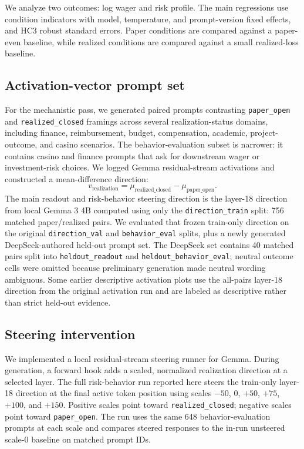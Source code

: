 \documentclass[final]{sparreport}
\begin{document}
We analyze two outcomes: log wager and risk profile. The main regressions use condition indicators with model, temperature, and prompt-version fixed effects, and HC3 robust standard errors. Paper conditions are compared against a paper-even baseline, while realized conditions are compared against a small realized-loss baseline.

\subsection{Activation-vector prompt set}

For the mechanistic pass, we generated paired prompts contrasting \texttt{paper\_open} and \texttt{realized\_closed} framings across several realization-status domains, including finance, reimbursement, budget, compensation, academic, project-outcome, and casino scenarios. The behavior-evaluation subset is narrower: it contains casino and finance prompts that ask for downstream wager or investment-risk choices. We logged Gemma residual-stream activations and constructed a mean-difference direction:
\[
v_{\mathrm{realization}} = \mu_{\mathrm{realized\_closed}} - \mu_{\mathrm{paper\_open}}.
\]
The main readout and risk-behavior steering direction is the layer-18 direction from local Gemma 3 4B computed using only the \texttt{direction\_train} split: 756 matched paper/realized pairs. We evaluated that frozen train-only direction on the original \texttt{direction\_val} and \texttt{behavior\_eval} splits, plus a newly generated DeepSeek-authored held-out prompt set. The DeepSeek set contains 40 matched pairs split into \texttt{heldout\_readout} and \texttt{heldout\_behavior\_eval}; neutral outcome cells were omitted because preliminary generation made neutral wording ambiguous. Some earlier descriptive activation plots use the all-pairs layer-18 direction from the original activation run and are labeled as descriptive rather than strict held-out evidence.

\subsection{Steering intervention}

We implemented a local residual-stream steering runner for Gemma. During generation, a forward hook adds a scaled, normalized realization direction at a selected layer. The full risk-behavior run reported here steers the train-only layer-18 direction at the final active token position using scales \(-50\), \(0\), \(+50\), \(+75\), \(+100\), and \(+150\). Positive scales point toward \texttt{realized\_closed}; negative scales point toward \texttt{paper\_open}. The run uses the same 648 behavior-evaluation prompts at each scale and compares steered responses to the in-run unsteered scale-\(0\) baseline on matched prompt IDs.
\end{document}
